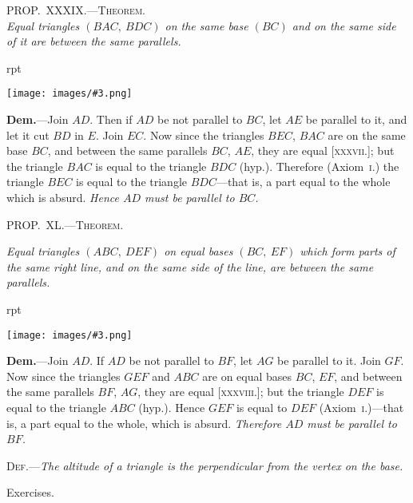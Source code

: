 \documentclass[oneside]{book}
\newcounter{wrapwidth}
\newcommand\myprop[2]{
\bigskip\Needspace*{4\baselineskip}\begin{center}\textsc{#1}\\\medskip\emph{#2}\par\end{center}
}
\newcommand\mypropl[2]{
\bigskip\Needspace*{4\baselineskip}\begin{center}\textsc{#1}\end{center}
\hspace{\parindent}\emph{#2}\par\medskip
}
\newcommand\exhead[1]{
\Needspace*{5\baselineskip}\begin{center}
\textsf{#1}
\end{center}
}
\newcommand\imgflow[3]{
\setcounter{wrapwidth}{#1}
\begin{wrapfigure}[#2]{r}{\value{wrapwidth}pt}
\begin{center}
\vspace{-0.3in}
\texttt{[image: images/\#3.png]}
\end{center}
\end{wrapfigure}
}
\begin{document}
\myprop{PROP\@.~XXXIX\@.---Theorem.}{Equal triangles $(BAC,\ BDC)$ on the same base $(BC)$ and
on the same side of it are between the same parallels.}

\imgflow{128}{8}{f059}

\textbf{Dem.}---Join $AD$. Then if $AD$ be not parallel to $BC$,
let $AE$ be parallel to it, and
let it cut $BD$ in $E$. Join $EC$.
Now since the triangles $BEC$,
$BAC$ are on the same base $BC$,
and between the same parallels
$BC$, $AE$, they are equal [\textsc{xxxvii}.];
but the triangle $BAC$ is equal
to the triangle $BDC$ (hyp.).
Therefore (Axiom~\textsc{i}.) the triangle $BEC$ is equal to
the triangle $BDC$---that is, a part equal to the whole
which is absurd. \emph{Hence $AD$ must be parallel to $BC$.}


\mypropl{PROP\@.~XL\@.---Theorem.}{Equal triangles $(ABC,\ DEF)$ on equal bases $(BC,\ EF)$
which form parts of the same right line, and on the same
side of the line, are between the same parallels.}

\imgflow{170}{7}{f060}

\textbf{Dem.}---Join $AD$. If $AD$ be not parallel to $BF$, let
$AG$ be parallel to it.
Join $GF$. Now since
the triangles $GEF$ and
$ABC$ are on equal bases
$BC$, $EF$, and between
the same parallels $BF$,
$AG$, they are equal
[\textsc{xxxviii}.]; but the triangle
$DEF$ is equal to the triangle $ABC$ (hyp.). Hence
$GEF$ is equal to $DEF$ (Axiom~\textsc{i}.)---that is, a part equal
to the whole, which is absurd. \emph{Therefore $AD$ must be
parallel to $BF$.}\par\medskip

\textsc{Def}.---\emph{The altitude of a triangle is the perpendicular
from the vertex on the base.}


\exhead{Exercises.}
\end{document}

